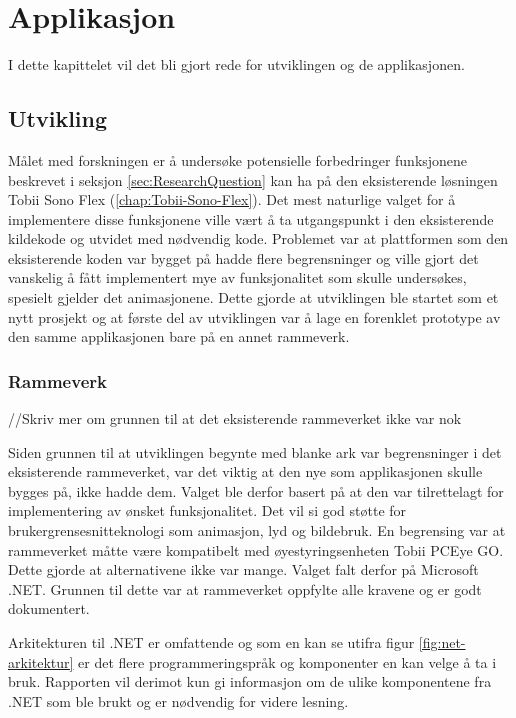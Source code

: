 
\chapter{Applikasjon}

I dette kapittelet vil det bli gjort rede for utviklingen og de applikasjonen.


\section{Utvikling}

Målet med forskningen er å undersøke potensielle forbedringer funksjonene beskrevet i seksjon \ref{sec:ResearchQuestion} kan ha på den eksisterende løsningen Tobii Sono Flex (\ref{chap:Tobii-Sono-Flex}). Det mest naturlige valget for å implementere disse funksjonene ville vært å ta utgangspunkt i den eksisterende kildekode og utvidet med nødvendig kode. Problemet var at plattformen som den eksisterende koden var bygget på hadde flere begrensninger og ville gjort det vanskelig å fått implementert mye av funksjonalitet som skulle undersøkes, spesielt gjelder det animasjonene. Dette gjorde at utviklingen ble startet som et nytt prosjekt og at første del av utviklingen var å lage en forenklet prototype av den samme applikasjonen bare på en annet rammeverk.

\subsection{Rammeverk} //Skriv mer om  grunnen til at det eksisterende rammeverket ikke var nok

Siden grunnen til at utviklingen begynte med blanke ark var begrensninger i det eksisterende rammeverket, var det viktig at den nye som applikasjonen skulle bygges på, ikke hadde dem. Valget ble derfor basert på at den var tilrettelagt for implementering av ønsket funksjonalitet. Det vil si god støtte for brukergrensesnitteknologi som animasjon, lyd og bildebruk. En begrensing var at rammeverket måtte være kompatibelt med øyestyringsenheten Tobii PCEye GO. Dette gjorde at alternativene ikke var mange. 
Valget falt derfor på Microsoft .NET. Grunnen til dette var at rammeverket oppfylte alle kravene og er godt dokumentert.

Arkitekturen til .NET er omfattende og som en kan se utifra figur \ref{fig:net-arkitektur} er det flere programmeringspråk og komponenter en kan velge å ta i bruk. Rapporten vil derimot kun gi informasjon om de ulike komponentene fra .NET som ble brukt og er nødvendig for videre lesning.


